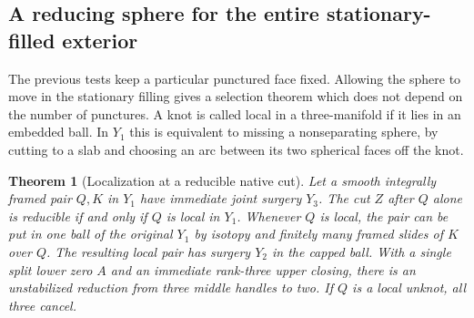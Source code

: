 \documentclass[11pt,letterpaper]{article}
\numberwithin{equation}{section}
\newtheorem{theorem}{Theorem}[section]
\theoremstyle{remark}
\begin{document}
\subsection{A reducing sphere for the entire stationary-filled exterior}
\label{sec:filled-sphere}
The previous tests keep a particular punctured face fixed. Allowing the
sphere to move in the stationary filling gives a selection theorem which
does not depend on the number of punctures. A knot is called local in a
three-manifold if it lies in an embedded ball. In \(Y_1\) this is equivalent
to missing a nonseparating sphere, by cutting to a slab and choosing
an arc between its two spherical faces off the knot.

\begin{theorem}[Localization at a reducible native cut]\label{thm:filled-localization}
Let a smooth integrally framed pair \(Q,K\) in \(Y_1\) have immediate
joint surgery \(Y_3\). The cut \(Z\) after \(Q\) alone is reducible if
and only if \(Q\) is local in \(Y_1\). Whenever \(Q\) is local, the pair can be put in one ball of the original
\(Y_1\) by isotopy and finitely many framed slides of \(K\) over \(Q\).
The resulting local pair has surgery \(Y_2\) in the capped ball.
With a single split lower zero \(A\) and an immediate rank-three upper
closing, there is an unstabilized reduction from three middle handles to
two. If \(Q\) is a local unknot, all three cancel.
\end{theorem}
\end{document}
